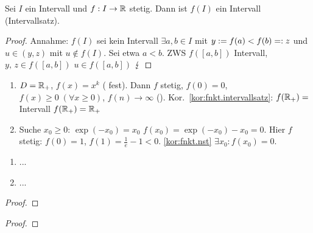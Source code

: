 \documentclass[12pt]{scrreprt}
\begin{document}
\begin{kor}\label{kor:fnkt.intervallsatz}
Sei $I$ ein Intervall und $f: I\rightarrow\mathbb{R}$ stetig. Dann ist $f(I)$ ein Intervall (Intervallsatz).
\end{kor}
\begin{proof}
Annahme: $f(I)$ sei kein Intervall \folgt $\exists a, b\in I$ mit $y:= f(a) < f(b) =: z$ und $u\in (y, z)$
mit $u\not\in f(I)$. Sei etwa $a < b$. ZWS \folgt $f([a, b])$ Intervall, $y,\,z\in f([a,b])$ \folgt $u\in f([a,b])$ \folgt $\lightning$
\end{proof}

\begin{bsp}\label{bsp:fnkt.nst-intsatz-bsp}
\begin{enumerate}
\item $D=\mathbb{R}_+$, $f(x)= x^k$ ( fest). Dann $f$ stetig, $f(0)=0$, $f(x) \ge 0\;(\forall x\ge 0)$, 
$f(n)\to\infty$ (\ninf). Kor.~\ref{kor:fnkt.intervallsatz}: $f(\mathbb{R}_+) = $ Intervall \folgt $f(\mathbb{R}_+) = \mathbb{R}_+$\label{bsp:fnkt.nst-intsatz-bsp.a}
\item Suche $x_0 \ge 0$: $\exp(-x_0) = x_0$ \gdw $f(x_0) = \exp(-x_0) - x_0 = 0$. Hier $f$ stetig: 
$f(0)=1$, $f(1)=\frac{1}{e} -1 <0$. \ref{kor:fnkt.nst} \folgt $\exists x_0: f(x_0) = 0$.
\label{bsp:fnkt.nst-intsatz-bsp.b}
\end{enumerate}
\end{bsp}

\begin{dfn}\label{dfn:fnkt.} %

\end{dfn}
\begin{bsp*}
\begin{enumerate}
\item ...
\item ...
\end{enumerate}
\end{bsp*}

\begin{bem}\label{}

\end{bem}
\begin{proof}

\end{proof}

\begin{thm}\label{}

\end{thm}
\begin{proof}

\end{proof}
\end{document}
